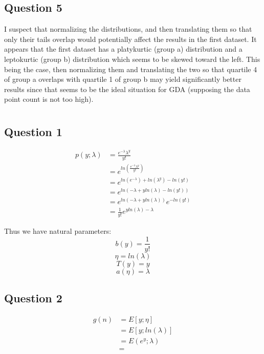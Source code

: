 \documentclass{article}
\begin{document}
\subsection{Question 5}

I suspect that normalizing the distributions, and then translating them so that 
only their tails overlap would potentially affect the results in the first 
dataset. 
It appears that the first dataset has a platykurtic (group a) distribution and
a leptokurtic (group b) distribution which seems to be skewed toward the left.
This being the case, then normalizing them and translating the two so that 
quartile 4 of group a overlaps with quartile 1 of group b may yield significantly
better results since that seems to be the ideal situation for GDA (supposing the
data point count is not too high).

\section{}
\subsection{Question 1}
\begin{center}
	\begin{align*}
		p(y; \lambda) &= \frac{e^{-\lambda}\lambda^y}{y!} \\
					  &= e^{
					  ln(
				  \frac{
			  e^{-\lambda}\lambda^y}{y!}
		  )} \\
		  &=  e ^{
			  ln(
			  e^{-\lambda}
			  )
			  + ln(\lambda^y)
			  - ln(y!)
		  } \\
			&= e^{ln(
				  -\lambda + yln(\lambda) - ln(y!))
			  }\\
			&= e^{
				ln(-\lambda + yln(\lambda))
			} e^{-ln(y!)}\\
			&= \frac{1}{y!}e^{yln(\lambda) - \lambda}
	\end{align*}
\end{center}
Thus we have natural parameters:
\[ b(y) = \frac{1}{y!} \]
\[ \eta = ln(\lambda) \]
\[ T(y) = y \]
\[ a(\eta) = \lambda \]

\subsection{Question 2}
\begin{center}
	\begin{align*}
		g(n) &= E\left[ y; \eta \right ]\\
			 &= E[y;ln(\lambda)]\\
			 &= E(e^y; \lambda)\\
			 &=
	 \end{align*}
\end{center}
\end{document}
